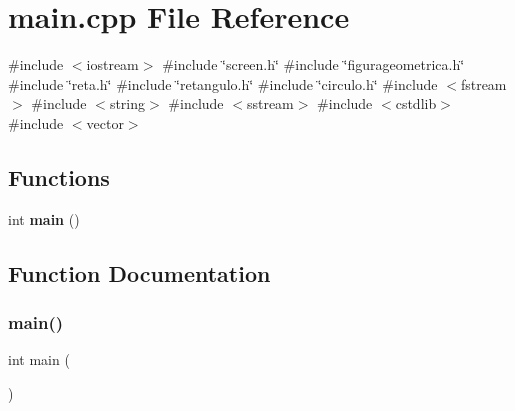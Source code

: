 \section{main.\+cpp File Reference}
\label{main_8cpp}
{\ttfamily \#include $<$iostream$>$}\newline
{\ttfamily \#include \char`\"{}screen.\+h\char`\"{}}\newline
{\ttfamily \#include \char`\"{}figurageometrica.\+h\char`\"{}}\newline
{\ttfamily \#include \char`\"{}reta.\+h\char`\"{}}\newline
{\ttfamily \#include \char`\"{}retangulo.\+h\char`\"{}}\newline
{\ttfamily \#include \char`\"{}circulo.\+h\char`\"{}}\newline
{\ttfamily \#include $<$fstream$>$}\newline
{\ttfamily \#include $<$string$>$}\newline
{\ttfamily \#include $<$sstream$>$}\newline
{\ttfamily \#include $<$cstdlib$>$}\newline
{\ttfamily \#include $<$vector$>$}\newline
\subsection*{Functions}
\begin{DoxyCompactItemize}
\item 
int \textbf{ main} ()
\end{DoxyCompactItemize}


\subsection{Function Documentation}
\mbox{\label{main_8cpp_ae66f6b31b5ad750f1fe042a706a4e3d4}} 
\subsubsection{main()}
{\footnotesize\ttfamily int main (\begin{DoxyParamCaption}{ }\end{DoxyParamCaption})}

